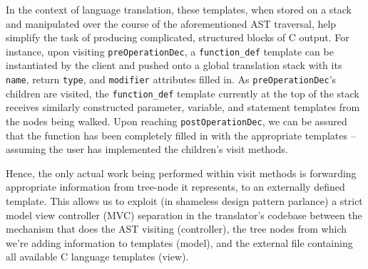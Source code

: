 \documentclass{sig-alternate}
\begin{document}
In the context of language translation, these templates, when stored on a stack and manipulated over the course of the aforementioned AST traversal, help simplify the task of producing complicated, structured blocks of C output. For instance, upon visiting \texttt{preOperationDec}, a \texttt{function\_def} template can be instantiated by the client and pushed onto a global translation stack with its \texttt{name}, return \texttt{type}, and \texttt{modifier} attributes filled in. As \texttt{preOperationDec}'s children are visited, the \texttt{function\_def} template currently at the top of the stack receives similarly constructed parameter, variable, and statement templates from the nodes being walked. Upon reaching \texttt{postOperationDec}, we can be assured that the function has been completely filled in with the appropriate templates -- assuming the user has implemented the children's visit methods.

Hence, the only actual work being performed within visit methods is forwarding appropriate information from tree-node it represents, to an externally defined template. This allows us to exploit (in shameless design pattern parlance) a strict model view controller (MVC) separation in the translator's codebase between the mechanism that does the AST visiting (controller), the tree nodes from which we're adding information to templates (model), and the external file containing all available C language templates (view).







\end{document}
